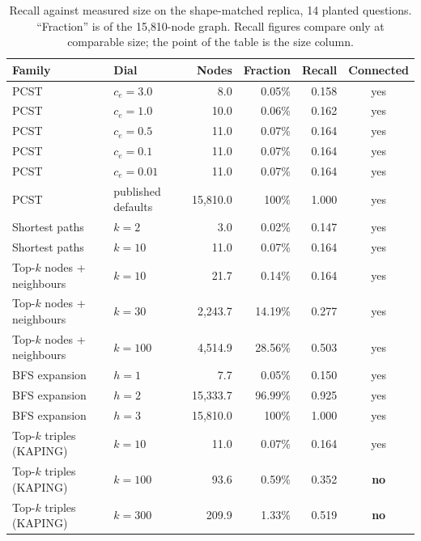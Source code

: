 \begin{table}[t]
\centering
\caption{Recall against measured size on the shape-matched replica, 14 planted
questions. ``Fraction'' is of the 15{,}810-node graph. Recall figures compare
only at comparable size; the point of the table is the size column.}
\label{tab:sweep}
\begin{tabular}{llrrrc}
\toprule
Family & Dial & Nodes & Fraction & Recall & Connected \\
\midrule
PCST & $c_e = 3.0$   & 8.0  & 0.05\% & 0.158 & yes \\
PCST & $c_e = 1.0$   & 10.0 & 0.06\% & 0.162 & yes \\
PCST & $c_e = 0.5$   & 11.0 & 0.07\% & 0.164 & yes \\
PCST & $c_e = 0.1$   & 11.0 & 0.07\% & 0.164 & yes \\
PCST & $c_e = 0.01$  & 11.0 & 0.07\% & 0.164 & yes \\
PCST & published defaults & 15{,}810.0 & 100\% & 1.000 & yes \\
\midrule
Shortest paths & $k = 2$  & 3.0  & 0.02\% & 0.147 & yes \\
Shortest paths & $k = 10$ & 11.0 & 0.07\% & 0.164 & yes \\
\midrule
Top-$k$ nodes + neighbours & $k = 10$  & 21.7    & 0.14\%  & 0.164 & yes \\
Top-$k$ nodes + neighbours & $k = 30$  & 2{,}243.7 & 14.19\% & 0.277 & yes \\
Top-$k$ nodes + neighbours & $k = 100$ & 4{,}514.9 & 28.56\% & 0.503 & yes \\
\midrule
BFS expansion & $h = 1$ & 7.7        & 0.05\%  & 0.150 & yes \\
BFS expansion & $h = 2$ & 15{,}333.7 & 96.99\% & 0.925 & yes \\
BFS expansion & $h = 3$ & 15{,}810.0 & 100\%   & 1.000 & yes \\
\midrule
Top-$k$ triples (KAPING) & $k = 10$  & 11.0  & 0.07\% & 0.164 & yes \\
Top-$k$ triples (KAPING) & $k = 100$ & 93.6  & 0.59\% & 0.352 & \textbf{no} \\
Top-$k$ triples (KAPING) & $k = 300$ & 209.9 & 1.33\% & 0.519 & \textbf{no} \\
\bottomrule
\end{tabular}
\end{table}

